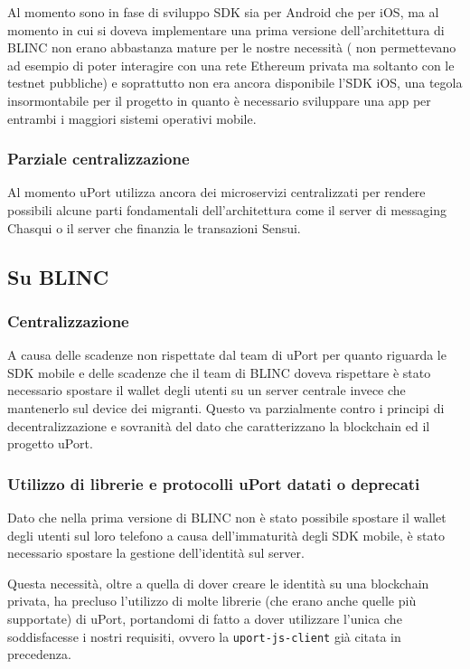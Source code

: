 Al momento sono in fase di sviluppo SDK sia per Android che per iOS, ma al momento in cui si doveva 
implementare una prima versione dell'architettura di BLINC non erano abbastanza mature per le nostre necessità (
non permettevano ad esempio di poter interagire con una rete Ethereum privata ma soltanto con le testnet pubbliche)
e soprattutto non era ancora disponibile l'SDK iOS, una tegola insormontabile per il progetto in quanto è necessario
sviluppare una app per entrambi i maggiori sistemi operativi mobile.

\subsubsection{Parziale centralizzazione}

Al momento uPort utilizza ancora dei microservizi centralizzati per rendere possibili alcune parti fondamentali
dell’architettura come il server di messaging Chasqui o il server che finanzia le transazioni Sensui.

\subsection{Su BLINC}

\subsubsection{Centralizzazione}

A causa delle scadenze non rispettate dal team di uPort per quanto riguarda le SDK mobile e delle scadenze
che il team di BLINC doveva rispettare è stato necessario spostare il wallet degli utenti su un server centrale
invece che mantenerlo sul device dei migranti. Questo va parzialmente contro i principi di decentralizzazione
e sovranità del dato che caratterizzano la blockchain ed il progetto uPort.

\subsubsection{Utilizzo di librerie e protocolli uPort datati o deprecati}

Dato che nella prima versione di BLINC non è stato possibile spostare il wallet degli utenti sul loro telefono
a causa dell'immaturità degli SDK mobile,
è stato necessario spostare la gestione dell'identità sul server.

Questa necessità, oltre a quella di dover creare le identità su una blockchain privata, ha precluso l'utilizzo di molte
librerie (che erano anche quelle più supportate) di uPort, portandomi di fatto a dover utilizzare l'unica che soddisfacesse
i nostri requisiti, ovvero la \texttt{uport-js-client} già citata in precedenza.

